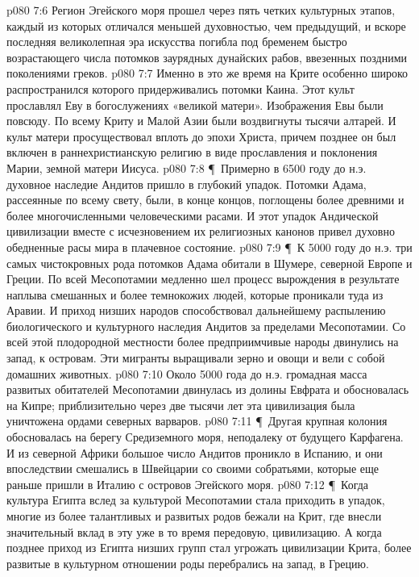 \vs p080 7:6 Регион Эгейского моря прошел через пять четких культурных этапов, каждый из которых отличался меньшей духовностью, чем предыдущий, и вскоре последняя великолепная эра искусства погибла под бременем быстро возрастающего числа потомков заурядных дунайских рабов, ввезенных поздними поколениями греков.
\vs p080 7:7 Именно в это же время на Крите особенно широко распространился  которого придерживались потомки Каина. Этот культ прославлял Еву в богослужениях «великой матери». Изображения Евы были повсюду. По всему Криту и Малой Азии были воздвигнуты тысячи алтарей. И культ матери просуществовал вплоть до эпохи Христа, причем позднее он был включен в раннехристианскую религию в виде прославления и поклонения Марии, земной матери Иисуса.
\vs p080 7:8 \P\ Примерно в 6500 году до н.э. духовное наследие Андитов пришло в глубокий упадок. Потомки Адама, рассеянные по всему свету, были, в конце концов, поглощены более древними и более многочисленными человеческими расами. И этот упадок Андической цивилизации вместе с исчезновением их религиозных канонов привел духовно обедненные расы мира в плачевное состояние.
\vs p080 7:9 \P\ К 5000 году до н.э. три самых чистокровных рода потомков Адама обитали в Шумере, северной Европе и Греции. По всей Месопотамии медленно шел процесс вырождения в результате наплыва смешанных и более темнокожих людей, которые проникали туда из Аравии. И приход низших народов способствовал дальнейшему распылению биологического и культурного наследия Андитов за пределами Месопотамии. Со всей этой плодородной местности более предприимчивые народы двинулись на запад, к островам. Эти мигранты выращивали зерно и овощи и вели с собой домашних животных.
\vs p080 7:10 Около 5000 года до н.э. громадная масса развитых обитателей Месопотамии двинулась из долины Евфрата и обосновалась на Кипре; приблизительно через две тысячи лет эта цивилизация была уничтожена ордами северных варваров.
\vs p080 7:11 \P\ Другая крупная колония обосновалась на берегу Средиземного моря, неподалеку от будущего Карфагена. И из северной Африки большое число Андитов проникло в Испанию, и они впоследствии смешались в Швейцарии со своими собратьями, которые еще раньше пришли в Италию с островов Эгейского моря.
\vs p080 7:12 \P\ Когда культура Египта вслед за культурой Месопотамии стала приходить в упадок, многие из более талантливых и развитых родов бежали на Крит, где внесли значительный вклад в эту уже в то время передовую, цивилизацию. А когда позднее приход из Египта низших групп стал угрожать цивилизации Крита, более развитые в культурном отношении роды перебрались на запад, в Грецию.
